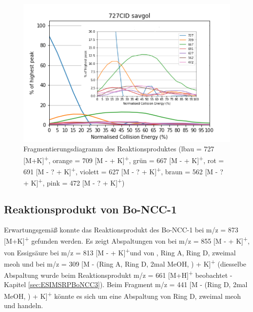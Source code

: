 \begin{figure}[!htbp]
  \centering
  \includegraphics[scale=0.7]{figures/Kapitel4/Kataboliten/diags/727CID-savgol.png}
  \caption[Fragmentierungsdiagramm des Reaktionsproduktes von Bo-DNCC, Quelle: Autor]{Fragmentierungsdiagramm des Reaktionsproduktes (lbau = 727 [M+K]\textsuperscript{+}, orange = 709 [M -  + K]\textsuperscript{+}, grün = 667 [M -  + K]\textsuperscript{+}, rot = 691 [M - ? + K]\textsuperscript{+}, violett = 627 [M - ? + K]\textsuperscript{+}, braun = 562 [M - ? + K]\textsuperscript{+}, pink = 472 [M - ? + K]\textsuperscript{+})}
  \label{fig:727MKLeafspraydiags}
\end{figure}



\subsection{Reaktionsprodukt von Bo-NCC-1}

Erwartungsgemäß konnte das Reaktionsprodukt des Bo-NCC-1 bei m/z = 873 [M+K]\textsuperscript{+} gefunden werden. Es zeigt Abspaltungen von  bei m/z = 855 [M -  + K]\textsuperscript{+}, von Essigsäure bei m/z = 813 [M -  + K]\textsuperscript{+}und von , Ring A, Ring D, zweimal \gls{meoh} und  bei m/z = 309 [M - (Ring A, Ring D, 2mal MeOH, )  + K]\textsuperscript{+} (diesselbe Abspaltung wurde beim Reaktionsprodukt m/z = 661 [M+H]\textsuperscript{+} beobachtet - Kapitel \ref{sec:ESIMSRPBoNCC3}). Beim Fragment m/z = 441 [M - (Ring D, 2mal MeOH, ) + K]\textsuperscript{+} könnte es sich um eine Abspaltung von Ring D, zweimal \gls{meoh} und  handeln. 

